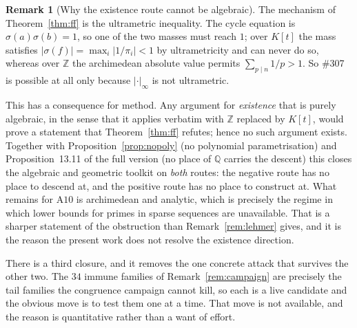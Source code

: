 \documentclass[11pt]{article}
\theoremstyle{definition}
\newtheorem{remark}[theorem]{Remark}
\begin{document}
\begin{remark}[Why the existence route cannot be algebraic]\label{rem:archimedean}
The mechanism of Theorem~\ref{thm:ff} is the ultrametric inequality. The cycle equation is
$\sigma(a)\sigma(b)=1$, so one of the two masses must reach $1$; over $K[t]$ the mass satisfies
$|\sigma(f)|=\max_i|1/\pi_i|<1$ by ultrametricity and can never do so, whereas over $\mathbb{Z}$ the
archimedean absolute value permits $\sum_{p\mid n}1/p>1$. So \#307 is possible at all only because
$|\cdot|_\infty$ is not ultrametric.

This has a consequence for method. Any argument for \emph{existence} that is purely algebraic, in
the sense that it applies verbatim with $\mathbb{Z}$ replaced by $K[t]$, would prove a statement
that Theorem~\ref{thm:ff} refutes; hence no such argument exists. Together with
Proposition~\ref{prop:nopoly} (no polynomial parametrisation) and Proposition~13.11 of the full version
(no place of $\mathbb{Q}$ carries the descent) this closes the algebraic and geometric toolkit on
\emph{both} routes: the negative route has no place to descend at, and the positive route has no
place to construct at. What remains for $\mathrm{A}10$ is archimedean and analytic, which is
precisely the regime in which lower bounds for primes in sparse sequences are unavailable. That is
a sharper statement of the obstruction than Remark~\ref{rem:lehmer} gives, and it is the reason the
present work does not resolve the existence direction.
\end{remark}

There is a third closure, and it removes the one concrete attack that survives the other two.
The $34$ immune families of Remark~\textup{\ref{rem:campaign}} are precisely the tail families the
congruence campaign cannot kill, so each is a live candidate and the obvious move is to test them
one at a time. That move is not available, and the reason is quantitative rather than a want of
effort.
\end{document}
